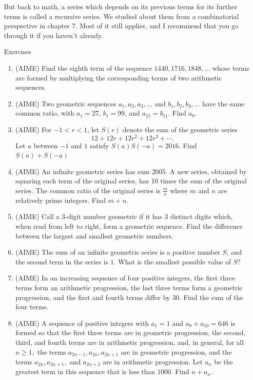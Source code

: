 But back to math, a series which depends on its previous terms for its further terms is called a recursive series. We studied about them from a combinatorial perspective in chapter 7. Most of it still applies, and I recommend that you go through it if you haven't already.\\
\begin{xcb}{Exercises}
\begin{enumerate}
\item (AIME) Find the eighth term of the sequence $1440, 1716, 1848,\dots$ whose terms are formed by multiplying the corresponding terms of two arithmetic sequences.
\item(AIME) Two geometric sequences $a_1, a_2, a_3, \ldots$ and $b_1, b_2, b_3, \ldots$ have the same common ratio, with $a_1 = 27$, $b_1=99$, and $a_{15}=b_{11}$. Find $a_9$.
\item (AIME) For $-1<r<1$, let $S(r)$ denote the sum of the geometric series\[12+12r+12r^2+12r^3+\cdots .\]Let $a$ between $-1$ and $1$ satisfy $S(a)S(-a)=2016$. Find $S(a)+S(-a)$
\item (AIME) An infinite geometric series has sum 2005. A new series, obtained by squaring each term of the original series, has 10 times the sum of the original series. The common ratio of the original series is $\frac mn$ where $m$ and $n$ are relatively prime integers. Find $m+n.$
\item (AIME) Call a $3$-digit number geometric if it has $3$ distinct digits which, when read from left to right, form a geometric sequence. Find the difference between the largest and smallest geometric numbers.
\item (AIME) The sum of an infinite geometric series is a positive number $S$, and the second term in the series is $1$. What is the smallest possible value of $S?$
\item (AIME) In an increasing sequence of four positive integers, the first three terms form an arithmetic progression, the last three terms form a geometric progression, and the first and fourth terms differ by $30$. Find the sum of the four terms.
\item (AIME) A sequence of positive integers with $a_1=1$ and $a_9+a_{10}=646$ is formed so that the first three terms are in geometric progression, the second, third, and fourth terms are in arithmetic progression, and, in general, for all $n\ge1,$ the terms $a_{2n-1}, a_{2n}, a_{2n+1}$ are in geometric progression, and the terms $a_{2n}, a_{2n+1},$ and $a_{2n+2}$ are in arithmetic progression. Let $a_n$ be the greatest term in this sequence that is less than $1000$. Find $n+a_n.$

\end{enumerate}
\end{xcb}
